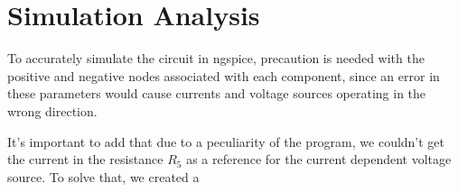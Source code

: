 \section{Simulation Analysis}
\label{sec:simulation}

To accurately simulate the circuit in ngspice, precaution is needed with the positive and negative nodes associated with each component, since an error in these parameters would cause currents and voltage sources operating in the wrong direction.

It's important to add that due to a peculiarity of the program, we couldn't get the current in the resistance $R_5$ as a reference for the current dependent voltage source. To solve that, we created a 
